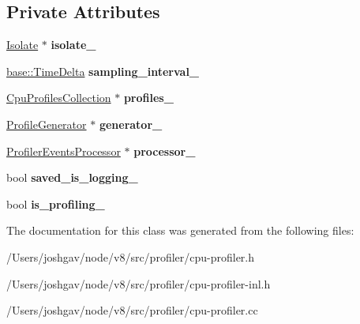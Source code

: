 \subsection*{Private Attributes}
\begin{DoxyCompactItemize}
\item 
\hyperlink{classv8_1_1internal_1_1_isolate}{Isolate} $\ast$ {\bfseries isolate\+\_\+}\hypertarget{classv8_1_1internal_1_1_cpu_profiler_a57dae7ba028f75a03dc362fe9bb5aedb}{}\label{classv8_1_1internal_1_1_cpu_profiler_a57dae7ba028f75a03dc362fe9bb5aedb}

\item 
\hyperlink{classv8_1_1base_1_1_time_delta}{base\+::\+Time\+Delta} {\bfseries sampling\+\_\+interval\+\_\+}\hypertarget{classv8_1_1internal_1_1_cpu_profiler_acc16afe26833a3bf7c5ed2ef7c1cd2d3}{}\label{classv8_1_1internal_1_1_cpu_profiler_acc16afe26833a3bf7c5ed2ef7c1cd2d3}

\item 
\hyperlink{classv8_1_1internal_1_1_cpu_profiles_collection}{Cpu\+Profiles\+Collection} $\ast$ {\bfseries profiles\+\_\+}\hypertarget{classv8_1_1internal_1_1_cpu_profiler_abcc8963516a1ac71bd898e23661b7c32}{}\label{classv8_1_1internal_1_1_cpu_profiler_abcc8963516a1ac71bd898e23661b7c32}

\item 
\hyperlink{classv8_1_1internal_1_1_profile_generator}{Profile\+Generator} $\ast$ {\bfseries generator\+\_\+}\hypertarget{classv8_1_1internal_1_1_cpu_profiler_ae553b6f6c7d3cb1d24d5b402d4a58073}{}\label{classv8_1_1internal_1_1_cpu_profiler_ae553b6f6c7d3cb1d24d5b402d4a58073}

\item 
\hyperlink{classv8_1_1internal_1_1_profiler_events_processor}{Profiler\+Events\+Processor} $\ast$ {\bfseries processor\+\_\+}\hypertarget{classv8_1_1internal_1_1_cpu_profiler_a962d16dda852ec0e3256ae957b5a61aa}{}\label{classv8_1_1internal_1_1_cpu_profiler_a962d16dda852ec0e3256ae957b5a61aa}

\item 
bool {\bfseries saved\+\_\+is\+\_\+logging\+\_\+}\hypertarget{classv8_1_1internal_1_1_cpu_profiler_a66ff669ab744f16a941593f157a3cbb4}{}\label{classv8_1_1internal_1_1_cpu_profiler_a66ff669ab744f16a941593f157a3cbb4}

\item 
bool {\bfseries is\+\_\+profiling\+\_\+}\hypertarget{classv8_1_1internal_1_1_cpu_profiler_ad9bd5edd910e3c56e203e9486d828fe0}{}\label{classv8_1_1internal_1_1_cpu_profiler_ad9bd5edd910e3c56e203e9486d828fe0}

\end{DoxyCompactItemize}


The documentation for this class was generated from the following files\+:\begin{DoxyCompactItemize}
\item 
/\+Users/joshgav/node/v8/src/profiler/cpu-\/profiler.\+h\item 
/\+Users/joshgav/node/v8/src/profiler/cpu-\/profiler-\/inl.\+h\item 
/\+Users/joshgav/node/v8/src/profiler/cpu-\/profiler.\+cc\end{DoxyCompactItemize}
